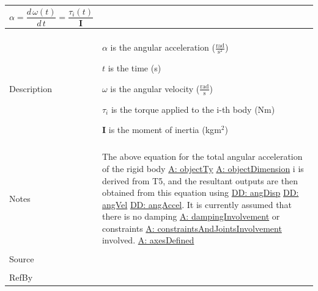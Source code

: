 \documentclass[12pt]{article}
\begin{document}
\begin{minipage}{\textwidth}
\begin{tabular}{p{} p{}}
\begin{displaymath}
                                                                             α=\frac{d\,ω\left(t\right)}{d\,t}=\frac{{τ_{i}}\left(t\right)}{\mathbf{I}}
                                                                             \end{displaymath}
                                                                             \\ \midrule \\
                                                                             Description & \begin{symbDescription}
                                                                                           \item{$α$ is the angular acceleration ($\frac{\text{rad}}{\text{s}^{2}}$)}
                                                                                           \item{$t$ is the time (s)}
                                                                                           \item{$ω$ is the angular velocity ($\frac{\text{rad}}{\text{s}}$)}
                                                                                           \item{${τ_{i}}$ is the torque applied to the i-th body (Nm)}
                                                                                           \item{$\mathbf{I}$ is the moment of inertia (kg$\text{m}^{2}$)}
                                                                                           \end{symbDescription}
                                                                                           \\ \midrule \\
                                                                                           Notes & The above equation for the total angular acceleration of the rigid body \hyperref[A:objectTy]{A: objectTy} \hyperref[A:objectDimension]{A: objectDimension} i is derived from T5, and the resultant outputs are then obtained from this equation using \hyperref[DD:angDisp]{DD: angDisp} \hyperref[DD:angVel]{DD: angVel} \hyperref[DD:angAccel]{DD: angAccel}. It is currently assumed that there is no damping \hyperref[A:dampingInvolvement]{A: dampingInvolvement} or constraints \hyperref[A:constraintsAndJointsInvolvement]{A: constraintsAndJointsInvolvement} involved. \hyperref[A:axesDefined]{A: axesDefined}
                                                                                                   \\ \midrule \\
                                                                                                   Source & \\ \midrule \\
                                                                                                            RefBy & 
\\ \bottomrule \end{tabular}
\end{minipage}
\end{document}
